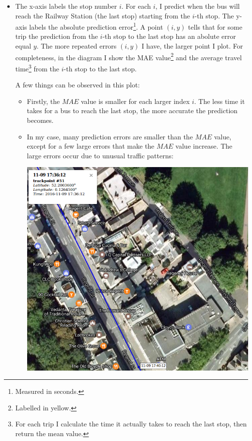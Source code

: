 \documentclass[12pt,a4paper,oneside,openright]{report}
\begin{document}
\begin{itemize}

\item[]
   The x-axis labels the stop number $i$. For each $i$, I predict when the bus
   will reach the Railway Station (the last stop) starting from the $i$-th stop.
   The y-axis labels the absolute prediction error\footnote{Measured in seconds.}.
   A point $(i, y)$ tells that for some trip the prediction from the $i$-th stop
   to the last stop has an abolute error equal $y$. The more repeated errors
   $(i, y)$ I have, the larger point I plot. For completeness,
   in the diagram I show the MAE value\footnote{Labelled in yellow.} and the 
   average travel time\footnote{For each trip I calculate the time it actually
   takes to reach the last stop, then return the mean value.} from the $i$-th stop
   to the last stop.

   A few things can be observed in this plot:
   
\begin{itemize} 
   
   \item 
   Firstly, the $MAE$ value is smaller
   for each larger index $i$. The less time it takes for a bus to reach the last
   stop, the more accurate the prediction becomes.

   \item
   In my case, many prediction errors are smaller than the $MAE$ value,
   except for a few large errors that make the $MAE$ value increase. The large errors
   occur due to unusual traffic patterns:

   \includegraphics[scale=0.6]{figs/unusual_pattern.png} \\


\end{itemize}
\end{itemize}
\end{document}
